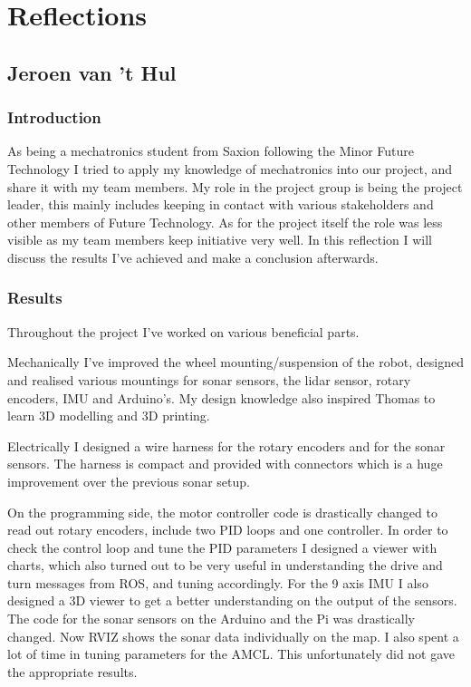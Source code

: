 \section{Reflections}

\subsection{Jeroen van 't Hul}

\subsubsection{Introduction}
As being a mechatronics student from Saxion following the Minor Future Technology I tried to apply my knowledge of mechatronics into our project, and share it with my team members. 
My role in the project group is being the project leader, this mainly includes keeping in contact with various stakeholders and other members of Future Technology. 
As for the project itself the role was less visible as my team members keep initiative very well. 
In this reflection I will discuss the results I've achieved and make a conclusion afterwards.


\subsubsection{Results}
Throughout the project I've worked on various beneficial parts. 

Mechanically I've improved the wheel mounting/suspension of the robot, designed and realised various mountings for sonar sensors, the lidar sensor, rotary encoders, IMU and Arduino's. My design knowledge also inspired Thomas to learn 3D modelling and 3D printing.

Electrically I designed a wire harness for the rotary encoders and for the sonar sensors. 
The harness is compact and provided with connectors which is a huge improvement over the previous sonar setup.

On the programming side, the motor controller code is drastically changed to read out rotary encoders, include two PID loops and one controller. 
In order to check the control loop and tune the PID parameters I designed a viewer with charts, which also turned out to be very useful in understanding the drive and turn messages from ROS, and tuning accordingly.
For the 9 axis IMU I also designed a 3D viewer to get a better understanding on the output of the sensors.
The code for the sonar sensors on the Arduino and the Pi was drastically changed. Now RVIZ shows the sonar data individually on the map.
I also spent a lot of time in tuning parameters for the AMCL. This unfortunately did not gave the appropriate results. 

